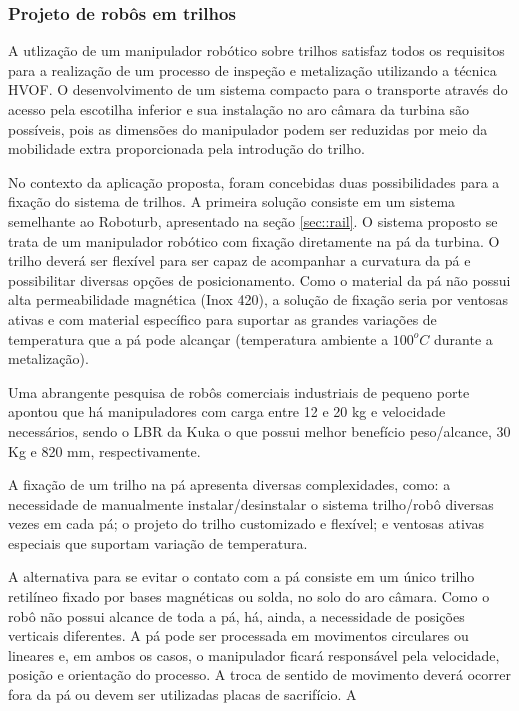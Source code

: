 \subsubsection{Projeto de robôs em trilhos}\label{proj_rail}
 
A utlização de um manipulador robótico sobre trilhos satisfaz todos os
requisitos para a realização de um processo de inspeção e metalização utilizando a técnica HVOF. O desenvolvimento
de um sistema compacto para o transporte através do acesso pela escotilha
inferior e sua instalação no aro câmara da turbina são possíveis, pois as
dimensões do manipulador podem ser reduzidas por meio da
mobilidade extra proporcionada pela introdução do trilho.

No contexto da aplicação proposta, foram concebidas duas possibilidades para a
fixação do sistema de trilhos. A primeira solução consiste em um sistema
semelhante ao Roboturb, apresentado na seção \ref{sec::rail}. O sistema proposto
se trata de um manipulador robótico com fixação diretamente na pá da
turbina. O trilho deverá ser flexível para ser capaz de acompanhar a curvatura
da pá e possibilitar diversas opções de posicionamento. Como o material da pá
não possui alta permeabilidade magnética (Inox 420), a solução de fixação seria
por ventosas ativas e com material específico para suportar as grandes
variações de temperatura que a pá pode alcançar (temperatura ambiente a
$100^oC$ durante a metalização).

Uma abrangente pesquisa de robôs comerciais industriais de pequeno porte apontou
que há manipuladores com carga entre 12 e 20 kg e velocidade necessários,
sendo o LBR da Kuka o que possui melhor benefício peso/alcance, 30 Kg e 820 mm,
respectivamente. %

A fixação de um trilho na pá apresenta diversas complexidades, como: a
necessidade de manualmente instalar/desinstalar o sistema trilho/robô diversas
vezes em cada pá; o projeto do trilho customizado e flexível; e ventosas ativas
especiais que suportam variação de temperatura.

A alternativa para se evitar o contato com a pá consiste em um único trilho
retilíneo fixado por bases magnéticas ou solda, no solo do aro câmara. Como o
robô não possui alcance de toda a pá, há, ainda, a necessidade de posições
verticais diferentes. A pá pode ser processada em movimentos circulares ou
lineares e, em ambos os casos, o manipulador ficará responsável pela velocidade,
posição e orientação do processo. A troca de sentido de movimento deverá
ocorrer fora da pá ou devem ser utilizadas placas de sacrifício. A

